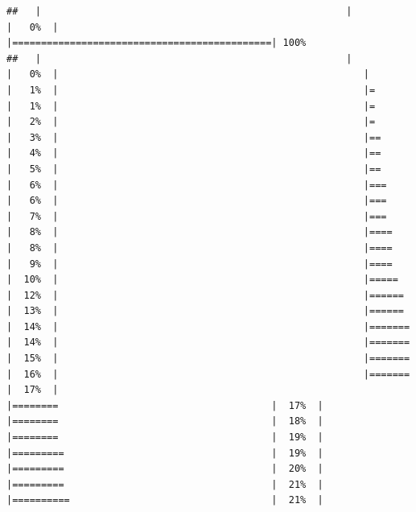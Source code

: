 \documentclass[
  krantz2]{krantz}
\begin{document}
\begin{verbatim}
##   |                                                     |                                             |   0%  |                                                     |=============================================| 100%
##   |                                                     |                                             |   0%  |                                                     |                                             |   1%  |                                                     |=                                            |   1%  |                                                     |=                                            |   2%  |                                                     |=                                            |   3%  |                                                     |==                                           |   4%  |                                                     |==                                           |   5%  |                                                     |==                                           |   6%  |                                                     |===                                          |   6%  |                                                     |===                                          |   7%  |                                                     |===                                          |   8%  |                                                     |====                                         |   8%  |                                                     |====                                         |   9%  |                                                     |====                                         |  10%  |                                                     |=====                                        |  12%  |                                                     |======                                       |  13%  |                                                     |======                                       |  14%  |                                                     |=======                                      |  14%  |                                                     |=======                                      |  15%  |                                                     |=======                                      |  16%  |                                                     |=======                                      |  17%  |                                                     |========                                     |  17%  |                                                     |========                                     |  18%  |                                                     |========                                     |  19%  |                                                     |=========                                    |  19%  |                                                     |=========                                    |  20%  |                                                     |=========                                    |  21%  |                                                     |==========                                   |  21%  |     
\end{verbatim}
\end{document}
